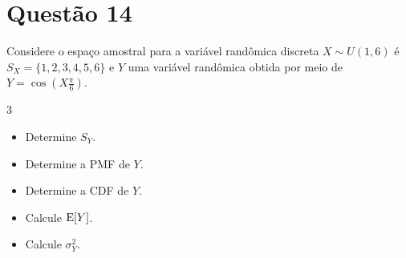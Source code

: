 \section{Questão 14}

Considere o espaço amostral para a variável randômica discreta $X\sim U(1, 6)$ é 
$S_X = \{1, 2, 3, 4, 5, 6\}$ e 
$Y$ uma variável randômica obtida por meio de $Y = \cos\left(X\frac{\pi}{6}\right)$.

\begin{multicols}{3}
    \begin{itemize}
        \item [a)] Determine $S_Y$.
        \item [b)] Determine a PMF de $Y$. \columnbreak
        \item [c)] Determine a CDF de $Y$.
        \item [d)] Calcule $\mathrm{E}\!\left[Y\right]$.
        \item [e)] Calcule $\sigma_Y^2$.
    \end{itemize}
\end{multicols}

\respostas

